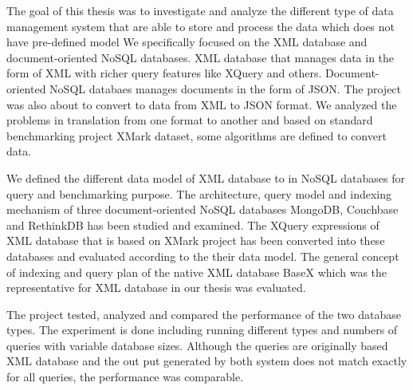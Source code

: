 The goal of this thesis was to investigate and analyze the different type of data management system that are able to store and process the data which does not have pre-defined model
We specifically focused on the XML database and document-oriented NoSQL databases. XML database that manages data in the form of XML with richer query features like XQuery and others. Document-oriented NoSQL databaes manages documents in the form of JSON.
The project was also about to convert to data from XML to JSON format. We analyzed the problems  in translation from one format to another and  based on standard benchmarking project XMark dataset, some algorithms are defined to convert data.

We defined the different data model of XML database  to in NoSQL databases for query and benchmarking purpose. The architecture, query model and indexing mechanism of three document-oriented NoSQL databases MongoDB, Couchbase and RethinkDB has been studied and examined. The XQuery expressions of XML database that is based on XMark project has been converted into these databases and evaluated according to the their data model. The general concept of indexing and query plan of the native XML database BaseX which was the representative for XML database in our thesis was evaluated. 
\par
The project tested, analyzed and compared the performance of the two database types. The experiment is done including running different types and numbers of queries with variable database sizes. Although the queries are originally based XML database and the out put generated by both system does not match exactly for all queries, the performance was comparable. 







